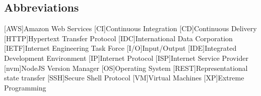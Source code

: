 \newcommand{\abbr}{Abbreviations}
\subsection{Abbreviations}

\begin{acronym}[1234567890]		%
\setlength{\itemsep}{-\parsep}	%

[AWS]{Amazon Web Services}
[CI]{Continuous Integration}
[CD]{Continuous Delivery}
[HTTP]{Hypertext Transfer Protocol}
[IDC]{International Data Corporation}
[IETF]{Internet Engineering Task Force}
[I/O]{Input/Output}
[IDE]{Integrated Development Environment }
[IP]{Internet Protocol}
[ISP]{Internet Service Provider}
[nvm]{NodeJS Version Manager}
[OS]{Operating System}
[REST]{Representational state transfer}
[SSH]{Secure Shell Protocol}
[VM]{Virtual Machines}
[XP]{Extreme Programming}
\end{acronym}